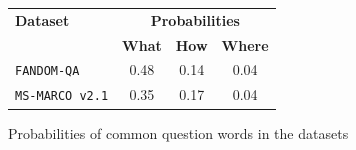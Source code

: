 \documentclass[11pt]{article}
\begin{document}
\begin{figure}
    \centering
    \caption{Probabilities of common question words in the datasets}
    \begin{tabular}{lccc}
        \hline
        \textbf{Dataset} & \multicolumn{3}{c}{\textbf{Probabilities}} \\
        & \textbf{What} & \textbf{How} & \textbf{Where}  \\
        \hline
        \texttt{FANDOM-QA} & 0.48 & 0.14 & 0.04 \\
        \texttt{MS-MARCO v2.1} & 0.35 & 0.17 & 0.04  \\
        \hline
    \end{tabular}
    \label{table2}
\end{figure}
\end{document}
